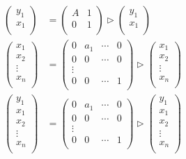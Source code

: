 \begin{equation}\begin{split}
	\begin{pmatrix}
		y_1 \\
		x_1 \\
	\end{pmatrix} &= \begin{pmatrix}
		A & 1 \\
		0 & 1 \\
	\end{pmatrix} \rhd \begin{pmatrix}
		y_1 \\
		x_1 \\
	\end{pmatrix} \\
	\begin{pmatrix}
		x_1 \\
		x_2 \\
		\vdots \\
		x_n \\
	\end{pmatrix} &= \begin{pmatrix}
		0 & a_1 & \cdots & 0 \\
		0 & 0 & \cdots & 0 \\
		\vdots \\
		0 & 0 & \cdots & 1 \\
	\end{pmatrix} \rhd \begin{pmatrix}
		x_1 \\
		x_2 \\
		\vdots \\
		x_n \\
	\end{pmatrix} \\
	\begin{pmatrix}
		y_1 \\
		x_1 \\
		x_2 \\
		\vdots \\
		x_n \\
	\end{pmatrix} &= \begin{pmatrix}
		0 & a_1 & \cdots & 0 \\
		0 & 0 & \cdots & 0 \\
		\vdots \\
		0 & 0 & \cdots & 1 \\
	\end{pmatrix} \rhd \begin{pmatrix}
		y_1 \\
		x_1 \\
		x_2 \\
		\vdots \\
		x_n \\
	\end{pmatrix} \\
\end{split}\end{equation}

